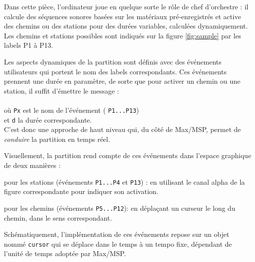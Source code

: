 \documentclass{article}
\newcommand{\OSC}[1]	{{\fontsize{9pt}{9pt} \selectfont\texttt{#1}}}
\newcommand{\tab}{\hspace*{4mm}}
\let\olditemize\itemize
\let\oldenditemize\enditemize
\renewenvironment{itemize} 	{\olditemize \renewcommand{\labelitemi}{$\bullet$} \setlength{\itemsep}{0mm}}{\oldenditemize}
\begin{document}
Dans cette pièce, l'ordinateur joue en quelque sorte le rôle de chef d'orchestre : il calcule des séquences sonores basées sur les matériaux pré-enregistrés et active des chemins ou des stations pour des durées variables, calculées dynamiquement. Les chemins et stations possibles sont indiqués sur la figure \ref{fig:sample} par les labels P1 à P13. 

Les aspects dynamiques de la partition sont définis avec des événements utilisateurs qui portent le nom des labels correspondants. Ces événements prennent une durée en paramètre, de sorte que pour activer un chemin ou une station, il suffit d'émettre le message :\\
\tab \tab \OSC{/ITL/scene Px d} \\
où \OSC{Px} est le nom de l'événement (\OSC{P1...P13})\\
 et \OSC{d} la durée correspondante. \\
C'est donc une approche de haut niveau qui, du côté de Max/MSP, permet de \emph{conduire} la partition en temps réel.

\vspace{2mm}
Visuellement, la partition rend compte de ces événements dans l'espace graphique de deux manières :
\begin{itemize}
\item pour les stations (événements \OSC{P1...P4} et \OSC{P13}) : en utilisant le canal alpha de la figure correspondante pour indiquer son activation.
\item pour les chemins (événements \OSC{P5...P12}): en déplaçant un curseur le long du chemin, dans le sens correspondant.
\end{itemize}

Schématiquement, l'implémentation de ces événements repose sur un objet nommé \OSC{cursor} qui se déplace dans le temps à un tempo fixe, dépendant de l'unité de temps adoptée par Max/MSP. 
\end{document}
